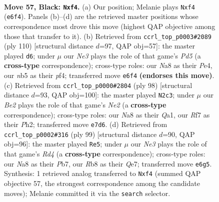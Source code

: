 \documentclass[11pt]{article}
\begin{document}
\clearpage

\begin{figure}[p]\centering
\begin{subfigure}{0.46\textwidth}\centering
\resizebox{\linewidth}{!}{%
\newchessgame
\chessboard[
  setfen={nr4k1/3qbr2/4n3/PNp2p1p/3p1Pp1/6P1/QR1BP2P/2RN2K1 b - - 0 57},
  showmover=false,
  pgfstyle=straightmove, color=movearrow, markmove={e6-f4}
]}
\caption{}
\end{subfigure}\hfill
\begin{subfigure}{0.46\textwidth}\centering
\resizebox{\linewidth}{!}{%
\newchessgame
\chessboard[
  setfen={1r2b1k1/1q1r1n2/2p2p1p/2BPp2P/P3PpP1/1P3R2/2BQ2R1/7K w - - 2 56},
  showmover=false,
  pgfstyle=straightmove, color=movearrow, markmove={d5-d6}
]}
\caption{}
\end{subfigure}
\\[4pt]
\begin{subfigure}{0.46\textwidth}\centering
\resizebox{\linewidth}{!}{%
\newchessgame
\chessboard[
  setfen={2r5/3rb2k/pB4pp/Pb2p3/1Pq1N3/3nRP2/4N1PP/Q2R3K w - - 9 50},
  showmover=false,
  pgfstyle=straightmove, color=movearrow, markmove={e2-c3}
]}
\caption{}
\end{subfigure}\hfill
\begin{subfigure}{0.46\textwidth}\centering
\resizebox{\linewidth}{!}{%
\newchessgame
\chessboard[
  setfen={8/1p2q1k1/pP4b1/P1pr3p/3nN1pP/3P1pP1/5P1K/2Q1RB2 b - - 14 50},
  showmover=false,
  pgfstyle=straightmove, color=movearrow, markmove={d5-e5}
]}
\caption{}
\end{subfigure}
\caption{\textbf{Move 57, Black: \texttt{Nxf4}.} (a) Our position; Melanie plays \texttt{Nxf4} (\texttt{e6f4}). Panels (b)--(d) are the retrieved master positions whose correspondence most drove this move (highest QAP objective among those that transfer to it). (b) Retrieved from \texttt{ccrl\_top\_p0003\#2089} (ply 110) [structural distance $d$=97, QAP obj=57]: the master played \texttt{d6}; under $\mu$ our \emph{Ne3} plays the role of that game's \emph{Pd5} (a \textbf{cross-type} correspondence); cross-type roles: our \emph{N}a8 as their \emph{P}e4, our \emph{n}b5 as their \emph{p}f4; transferred move \texttt{e6f4} \textbf{(endorses this move)}. (c) Retrieved from \texttt{ccrl\_top\_p0000\#2804} (ply 98) [structural distance $d$=93, QAP obj=100]: the master played \texttt{N2c3}; under $\mu$ our \emph{Be2} plays the role of that game's \emph{Ne2} (a \textbf{cross-type} correspondence); cross-type roles: our \emph{N}a8 as their \emph{Q}a1, our \emph{R}f7 as their \emph{P}h2; transferred move \texttt{e7d6}. (d) Retrieved from \texttt{ccrl\_top\_p0002\#316} (ply 99) [structural distance $d$=90, QAP obj=96]: the master played \texttt{Re5}; under $\mu$ our \emph{Ne3} plays the role of that game's \emph{Rd4} (a \textbf{cross-type} correspondence); cross-type roles: our \emph{N}a8 as their \emph{P}b7, our \emph{R}b8 as their \emph{Q}e7; transferred move \texttt{e6g5}. Synthesis: 1 retrieved analog transferred to \texttt{Nxf4} (summed QAP objective 57, the strongest correspondence among the candidate moves); Melanie committed it via the \texttt{search} selector.}
\label{fig:thought-m113}
\end{figure}
\end{document}

